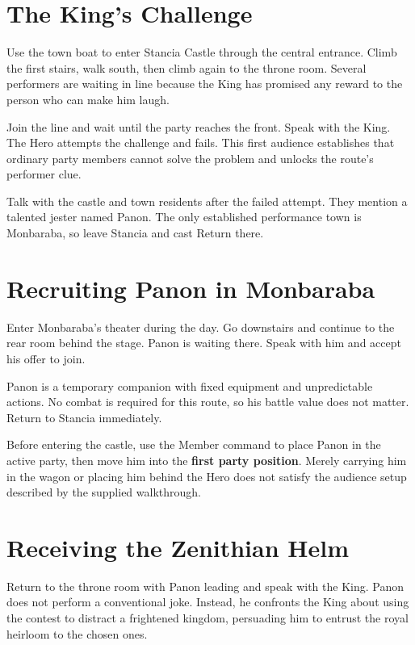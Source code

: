 \documentclass[
  american,
  10pt,
  letterpaper,
  oneside,
  open=any]{scrreprt}
\begin{document}
\section{The King's Challenge}\label{the-kings-challenge}

Use the town boat to enter Stancia Castle through the central entrance.
Climb the first stairs, walk south, then climb again to the throne room.
Several performers are waiting in line because the King has promised any
reward to the person who can make him laugh.

Join the line and wait until the party reaches the front. Speak with the
King. The Hero attempts the challenge and fails. This first audience
establishes that ordinary party members cannot solve the problem and
unlocks the route's performer clue.

Talk with the castle and town residents after the failed attempt. They
mention a talented jester named Panon. The only established performance
town is Monbaraba, so leave Stancia and cast Return there.

\section{Recruiting Panon in
Monbaraba}\label{recruiting-panon-in-monbaraba}

Enter Monbaraba's theater during the day. Go downstairs and continue to
the rear room behind the stage. Panon is waiting there. Speak with him
and accept his offer to join.

Panon is a temporary companion with fixed equipment and unpredictable
actions. No combat is required for this route, so his battle value does
not matter. Return to Stancia immediately.

Before entering the castle, use the Member command to place Panon in the
active party, then move him into the \textbf{first party position}.
Merely carrying him in the wagon or placing him behind the Hero does not
satisfy the audience setup described by the supplied walkthrough.

\section{Receiving the Zenithian
Helm}\label{receiving-the-zenithian-helm}

Return to the throne room with Panon leading and speak with the King.
Panon does not perform a conventional joke. Instead, he confronts the
King about using the contest to distract a frightened kingdom,
persuading him to entrust the royal heirloom to the chosen ones.
\end{document}
